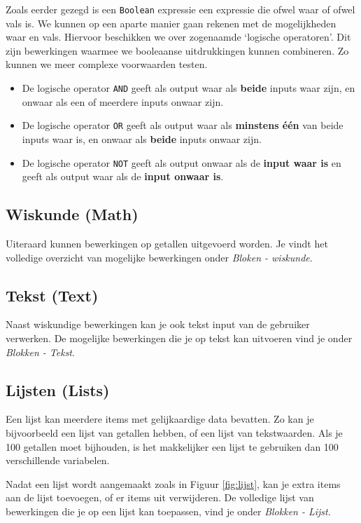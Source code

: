 Zoals eerder gezegd is een \texttt{Boolean} expressie een expressie die ofwel waar of ofwel vals is.
We kunnen op een aparte manier gaan rekenen met de mogelijkheden waar en vals.
Hiervoor beschikken we over zogenaamde \textquoteleft logische operatoren\textquoteright. 
Dit zijn bewerkingen waarmee we booleaanse uitdrukkingen kunnen combineren.
Zo kunnen we meer complexe voorwaarden testen. 

\begin{itemize}
	\item De logische operator \texttt{AND} geeft als output waar als \textbf{beide} inputs waar zijn, en onwaar als een of meerdere inputs onwaar zijn. 

	\item De logische operator \texttt{OR} geeft als output waar als \textbf{minstens \'e\'en} van beide inputs waar is, en onwaar als \textbf{beide} inputs onwaar zijn.
	
	\item De logische operator \texttt{NOT} geeft als output onwaar als de \textbf{input waar is} en geeft als output waar als de \textbf{input onwaar is}.
\end{itemize}

\subsection{Wiskunde (Math)}
Uiteraard kunnen bewerkingen op getallen uitgevoerd worden. Je vindt het volledige overzicht van mogelijke bewerkingen onder \emph{Bloken - wiskunde}.

\subsection{Tekst (Text)}
Naast wiskundige bewerkingen kan je ook tekst input van de gebruiker verwerken. De mogelijke bewerkingen die je op tekst kan uitvoeren vind je onder \emph{Blokken - Tekst}.


\subsection{Lijsten (Lists)}
Een lijst kan meerdere items met gelijkaardige data bevatten. Zo kan je bijvoorbeeld een lijst van getallen hebben, of een lijst van tekstwaarden. Als je 100 getallen moet bijhouden, is het makkelijker een lijst te gebruiken dan 100 verschillende variabelen.

Nadat een lijst wordt aangemaakt zoals in Figuur \ref{fig:lijst}, kan je extra items aan de lijst toevoegen, of er items uit verwijderen. De volledige lijst van bewerkingen die je op een lijst kan toepassen, vind je onder \emph{Blokken - Lijst}.

